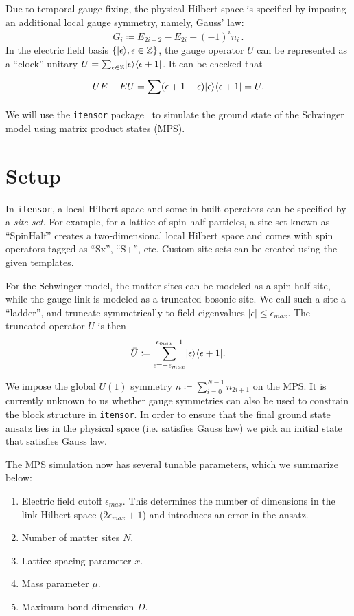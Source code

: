 \documentclass[aps,prl,reprint,superscriptaddress, onecolumn, 11pt]{revtex4-2}
\newcommand{\curly}[1]{\left\{#1\right\}}
\newcommand{\suml}[3]{\sum_{#1}^{#2}#3}
\newcommand{\iten}[0]{\texttt{itensor}}
\DeclarePairedDelimiter\bra{\langle}{\vert}
\DeclarePairedDelimiter\ket{\vert}{\rangle}
\theoremstyle{definition}
\theoremstyle{definition}
\begin{document}
Due to temporal gauge fixing, the physical Hilbert space is specified by imposing an additional local gauge symmetry, namely, Gauss' law:
\begin{equation}
  \label{eq:gaussLaw}
  G_i \coloneqq E_{2i+2} - E_{2i} - (-1)^in_i\, .
\end{equation}
In the electric field basis $\curly{\ket{\epsilon}, \epsilon\in\mathbb{Z}}$, the gauge operator $U$ can be represented as a ``clock'' unitary $U = \suml{\epsilon\in\mathbb{Z}}{}{\ket{\epsilon}\bra{\epsilon+1}}$. It can be checked that
\begin{equation}
  \label{eq:commutationcheck}
  UE - EU = \suml{}{}{(\epsilon+1-\epsilon)\ket{\epsilon}\bra{\epsilon+1}} = U.
\end{equation}
We will use the \iten{} package~\cite{itensor} to simulate the ground state of the Schwinger model using matrix product states (MPS).

\section{Setup}
\label{sec:setup}
In \iten{}, a local Hilbert space and some in-built operators can be specified by a \emph{site set}. For example, for a lattice of spin-half particles, a site set known as ``SpinHalf'' creates a two-dimensional local Hilbert space and comes with spin operators tagged as ``Sx'', ``S+'', etc. Custom site sets can be created using the given templates.

For the Schwinger model, the matter sites can be modeled as a spin-half site, while the gauge link is modeled as a truncated bosonic site. We call such a site a ``ladder'', and truncate symmetrically to field eigenvalues $|\epsilon|\le \epsilon_{max}$. The truncated operator $U$ is then
\begin{equation}
  \label{eq:truncatedU}
  \bar{U} \coloneqq \suml{\epsilon=-\epsilon_{max}}{\epsilon_{max}-1}{\ket{\epsilon}\bra{\epsilon+1}}.
\end{equation}

We impose the global $U(1)$ symmetry $n \coloneqq \suml{i=0}{N-1}{n_{2i+1}}$ on the MPS. It is currently unknown to us whether gauge symmetries can also be used to constrain the block structure in \iten{}. In order to ensure that the final ground state ansatz lies in the physical space (i.e. satisfies Gauss law) we pick an initial state that satisfies Gauss law.

The MPS simulation now has several tunable parameters, which we summarize below:
\begin{enumerate}
\item Electric field cutoff $\epsilon_{max}$. This determines the number of dimensions in the link Hilbert space ($2\epsilon_{max}+1$) and introduces an error in the ansatz.
\item Number of matter sites $N$.
\item Lattice spacing parameter $x$.
\item Mass parameter $\mu$.
\item Maximum bond dimension $D$.
\end{enumerate}
\end{document}
